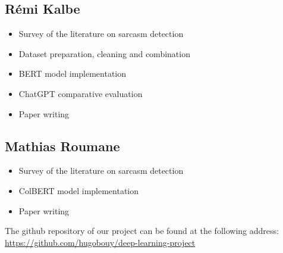 \documentclass[10pt,twocolumn,letterpaper]{article}
\begin{document}
\subsection{Rémi Kalbe}
\begin{itemize}
    \item Survey of the literature on sarcasm detection
    \item Dataset preparation, cleaning and combination
    \item BERT model implementation
    \item ChatGPT comparative evaluation
    \item Paper writing
\end{itemize}

\subsection{Mathias Roumane}
\begin{itemize}
    \item Survey of the literature on sarcasm detection
    \item ColBERT model implementation
    \item Paper writing
\end{itemize}

The github repository of our project can be found at the following address: \url{https://github.com/hugobouy/deep-learning-project}



\nocite{*}
{\small


}
\end{document}
